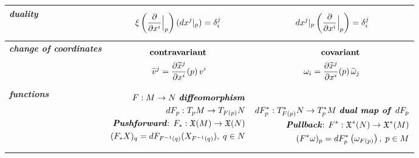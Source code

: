 \documentclass[11pt]{article}
\begin{document}
\begin{table}[h!]
\begin{tabularx}{1\textwidth} { 
  | >{\raggedright\arraybackslash} m{2cm}
  | >{\centering\arraybackslash}X
  | >{\centering\arraybackslash}X  | }
\hline
\emph{\textbf{duality}} & 
\vspace{-1.25em}
\begin{align*}
\xi\left(\frac{\partial }{ \partial x^{i}}\Bigr|_{p}\right)(dx^{j}|_{p}) = \delta_{i}^{j}
\end{align*} \vspace{-1em} &
\vspace{-1.25em}
\begin{align*}
dx^{j}|_{p}\left(\frac{\partial }{ \partial x^{i}}\Bigr|_{p}\right) = \delta_{i}^{j}
\end{align*} \vspace{-1em} \\
\hline
\emph{\textbf{change of coordinates}} &
\vspace{-1.25em}
\begin{align*}
\text{\textbf{contravariant}}\\
\widetilde{v}^{j}= \frac{\partial \widetilde{x}^{j}}{ \partial x^{i}}(p)\, v^{i}
\end{align*}\vspace{-1em}
&
\vspace{-1.25em}
\begin{align*}
\text{\textbf{covariant}}\\
\omega_{i} = \frac{\partial \widetilde{x}^{j}}{ \partial x^{i}}(p)\,\widetilde{\omega}_{j}
\end{align*}\vspace{-1em}
\\
\hline
\emph{\textbf{functions}} &
\vspace{-1.25em}
\begin{align*}
F: M \rightarrow N\text{ \emph{\textbf{diffeomorphism}}}\\
dF_{p}: T_pM \rightarrow T_{F(p)}N \\
\text{\emph{\textbf{Pushforward}}: }F_{*}: \mathfrak{X}(M) \rightarrow \mathfrak{X}(N)  \\
(F_{*}X)_{q} = dF_{F^{-1}(q)}(X_{F^{-1}(q)}),\; q\in N
\end{align*}\vspace{-1em}
&
\vspace{-1.25em}
\begin{align*}
\\
dF_{p}^{*}:  T_{F(p)}^{*}N \rightarrow T_{p}^{*}M \text{ \emph{\textbf{dual map of }}}dF_p\\
\text{\emph{\textbf{Pullback}}: }F^{*}: \mathfrak{X}^{*}(N) \rightarrow \mathfrak{X}^{*}(M)\\
(F^{*}\omega)_p = dF_{p}^{*}\left(\omega_{F(p)}\right),\; p\in M
\end{align*} \vspace{-1em}
\\
\hline
\end{tabularx}
\end{table}
\end{document}
